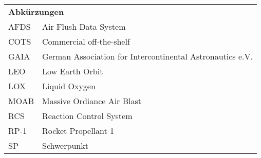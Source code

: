 \begin{longtable}[l]{ll}
	\multicolumn{2}{l}{\textbf{Abkürzungen}}\\
	AFDS&Air Flush Data System\\
	COTS&Commercial off-the-shelf\\
	GAIA&German Association for Intercontinental Astronautics e.V.\\
	LEO&Low Earth Orbit\\
	LOX&Liquid Oxygen\\
	MOAB&Massive Ordiance Air Blast\\
	RCS&Reaction Control System\\
	RP-1&Rocket Propellant 1\\
	SP&Schwerpunkt\\
\end{longtable}